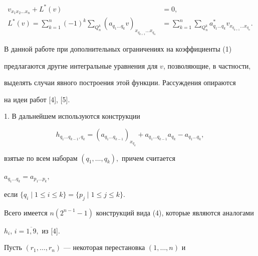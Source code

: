 \begin{equation}


\begin{split}


v_{x_{1} x_{2} \dotsc x_{n}}+L^{*}(v)&=0,\\


L^{*}(v)=


\sum_{k=1}^{n}(-1)^{k} \sum_{Q_{n}^{k}} (a_{q_{1}\dotsc q_{k}}


v)_{x_{q_{k+1}}\dotsc x_{q_{n}}}&=


\sum_{k=1}^{n} \sum_{Q_{n}^{k}} a_{q_{1}\dotsc q_{k}}^{*}


v_{x_{q_{k+1}}\dotsc x_{q_{n}}}.


\end{split}


\end{equation}


В данной работе при дополнительных ограничениях на коэффициенты (1)


предлагаются другие интегральные уравнения для $v$, позволяющие, в частности,


выделять случаи явного построения этой функции. Рассуждения опираются


на идеи работ [4], [5].





1. В дальнейшем используются конструкции


\begin{equation}


h_{q_{1}\dotsc q_{k-1},q_{k}}=(a_{q_{1}\dotsc q_{k-1}})_{x_{q_{k}}}+


a_{q_{1}\dotsc q_{k-1}}a_{q_{k}}-a_{q_{1}\dotsc q_{k}},


\end{equation}


взятые по всем наборам $(q_{1},\dotsc ,q_{k}),$ причем считается


$a_{q_{1}\dotsc q_{k}}=a_{p_{1}\dotsc p_{k}},$


если $\{q_{i}\mid 1\leq i\leq k \}=\{p_{j}\mid 1\leq j\leq k\}.$


Всего имеется $n(2^{n-1}-1)$ конструкций вида (4), которые являются аналогами


$h_{i}$, $i=\overline{1,9},$ из [4].





Пусть $(r_{1},\dotsc ,r_{n})$ --- некоторая перестановка $(1,\dotsc ,n)$ и


